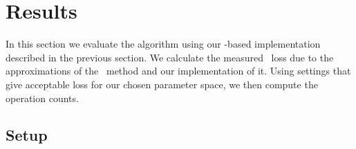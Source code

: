 \section{Results}
\label{SECIV}\label{sec:results}

In this section we evaluate the \lloid{} algorithm using our \gstreamer{}-based implementation described in the previous section. We calculate the
measured \SNR\ loss due to the approximations of the \lloid\ method and our
implementation of it. Using settings that give acceptable \SNR{} loss for
our chosen parameter space, we then compute the operation counts.

\subsection{Setup}

